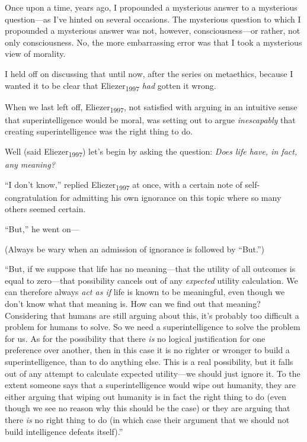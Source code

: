 {
 Once upon a time, years ago, I propounded a mysterious answer to a
mysterious question---as I've hinted on several
occasions. The mysterious question to which I propounded a mysterious
answer was not, however, consciousness---or rather, not only
consciousness. No, the more embarrassing error was that I took a
mysterious view of morality.}

{
 I held off on discussing that until now, after the series on
metaethics, because I wanted it to be clear that
Eliezer\textsubscript{1997} \textit{had} gotten it wrong.}

{
 When we last left off, Eliezer\textsubscript{1997}, not satisfied
with arguing in an intuitive sense that superintelligence would be
moral, was setting out to argue \textit{inescapably} that creating
superintelligence was the right thing to do.}

{
 Well (said Eliezer\textsubscript{1997}) let's
begin by asking the question: \textit{Does life have, in fact, any
meaning?}}

{
 ``I don't
know,'' replied Eliezer\textsubscript{1997} at once,
with a certain note of self-congratulation for admitting his own
ignorance on this topic where so many others seemed certain.}

{
 ``But,'' he went on---}

{
 (Always be wary when an admission of ignorance is followed by
``But.'')}

{
 ``But, if we suppose that life has no
meaning---that the utility of all outcomes is equal to zero---that
possibility cancels out of any \textit{expected} utility calculation.
We can therefore always \textit{act as if} life is known to be
meaningful, even though we don't know what that meaning
is. How can we find out that meaning? Considering that humans are still
arguing about this, it's probably too difficult a
problem for humans to solve. So we need a superintelligence to solve
the problem for us. As for the possibility that there \textit{is} no
logical justification for one preference over another, then in this
case it is no righter or wronger to build a superintelligence, than to
do anything else. This is a real possibility, but it falls out of any
attempt to calculate expected utility---we should just ignore it. To
the extent someone says that a superintelligence would wipe out
humanity, they are either arguing that wiping out humanity is in fact
the right thing to do (even though we see no reason why this should be
the case) or they are arguing that there \textit{is} no right thing to
do (in which case their argument that we should not build intelligence
defeats itself).''}

